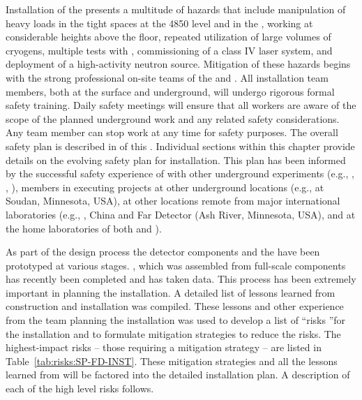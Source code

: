 %


Installation of the  presents a multitude of hazards that include  manipulation of heavy loads in the tight spaces at the 4850 level and in the ,  working at considerable heights above the floor, repeated utilization of large volumes of cryogens, multiple tests with , commissioning of a class IV laser system, and deployment of a high-activity neutron source. Mitigation of these hazards begins with the strong professional on-site  teams of the  and .
All installation team members, both at the surface and underground, will undergo rigorous formal safety training. Daily safety meetings will ensure that all workers are aware of the scope of the planned underground work and any related safety considerations. Any team member can stop work at any time for safety purposes. The overall  safety plan is described in   
 \tcchesh{} %
 of this .  Individual sections within this chapter provide details on the evolving safety plan for installation. This plan has been informed by the successful safety experience of  with other underground experiments (e.g., , , ),  members in executing projects at other underground locations (e.g.,  at Soudan, Minnesota, USA), at other locations remote from major international laboratories (e.g., , China and  Far Detector (Ash River, Minnesota, USA), and at the home laboratories of both  and ).



As part of the  design process the detector components and the  have been prototyped at various stages. , which was assembled from full-scale %
components has recently been completed and has taken data. 
This process has been extremely important in planning the  %
installation. A detailed list of lessons learned from  construction and installation was compiled\cite{bib:docdb8255}. 
These lessons %
and other experience from the team planning the installation was used to develop a list of \textquotedblleft risks \textquotedblright for the %
 installation and to formulate mitigation strategies to reduce the risks.
The highest-impact risks -- those requiring a mitigation strategy -- are listed in Table~\ref{tab:risks:SP-FD-INST}. 
These mitigation strategies and all the lessons learned from  will be factored into the detailed installation plan. A description of each of the high level risks follows.

